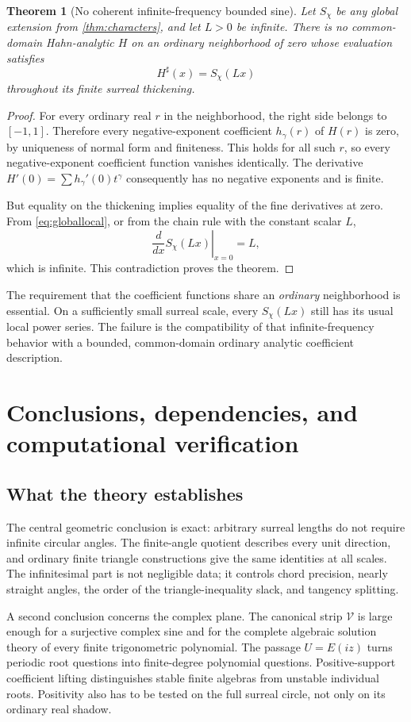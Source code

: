 \documentclass[11pt]{article}
\numberwithin{equation}{section}
\newtheorem{theorem}{Theorem}[section]
\theoremstyle{definition}
\newcommand{\sh}{^{\sharp}}
\begin{document}
\begin{theorem}[No coherent infinite-frequency bounded sine]\label{thm:infinitefrequency}
Let $S_\chi$ be any global extension from \cref{thm:characters}, and let $L>0$ be infinite. There is no common-domain Hahn-analytic $H$ on an ordinary neighborhood of zero whose evaluation satisfies
\[
 H\sh(x)=S_\chi(Lx)
\]
throughout its finite surreal thickening.
\end{theorem}
\begin{proof}
For every ordinary real $r$ in the neighborhood, the right side belongs to $[-1,1]$. Therefore every negative-exponent coefficient $h_\gamma(r)$ of $H(r)$ is zero, by uniqueness of normal form and finiteness. This holds for all such $r$, so every negative-exponent coefficient function vanishes identically. The derivative $H'(0)=\sum h_\gamma'(0)t^\gamma$ consequently has no negative exponents and is finite.

But equality on the thickening implies equality of the fine derivatives at zero. From \eqref{eq:globallocal}, or from the chain rule with the constant scalar $L$,
\[
 \left.\frac{d}{dx}S_\chi(Lx)\right|_{x=0}=L,
\]
which is infinite. This contradiction proves the theorem.
\end{proof}
The requirement that the coefficient functions share an \emph{ordinary} neighborhood is essential. On a sufficiently small surreal scale, every $S_\chi(Lx)$ still has its usual local power series. The failure is the compatibility of that infinite-frequency behavior with a bounded, common-domain ordinary analytic coefficient description.

\section{Conclusions, dependencies, and computational verification}\label{sec:conclusion}
\subsection{What the theory establishes}
The central geometric conclusion is exact: arbitrary surreal lengths do not require infinite circular angles. The finite-angle quotient describes every unit direction, and ordinary finite triangle constructions give the same identities at all scales. The infinitesimal part is not negligible data; it controls chord precision, nearly straight angles, the order of the triangle-inequality slack, and tangency splitting.

A second conclusion concerns the complex plane. The canonical strip $\mathscr V$ is large enough for a surjective complex sine and for the complete algebraic solution theory of every finite trigonometric polynomial. The passage $U=E(iz)$ turns periodic root questions into finite-degree polynomial questions. Positive-support coefficient lifting distinguishes stable finite algebras from unstable individual roots. Positivity also has to be tested on the full surreal circle, not only on its ordinary real shadow.
\end{document}

